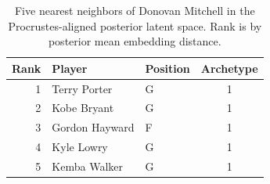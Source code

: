 \begin{table}[htbp]
  \centering\small
  \begin{tabular}{rllc}
    \toprule
    Rank & Player & Position & Archetype \\
    \midrule
    1 & Terry Porter & G & 1 \\
    2 & Kobe Bryant & G & 1 \\
    3 & Gordon Hayward & F & 1 \\
    4 & Kyle Lowry & G & 1 \\
    5 & Kemba Walker & G & 1 \\
    \bottomrule
  \end{tabular}
  \caption{Five nearest neighbors of Donovan Mitchell in the Procrustes-aligned posterior latent space. Rank is by posterior mean embedding distance.}
  \label{tab:Donovan_Mitchell_neighbors}
\end{table}

